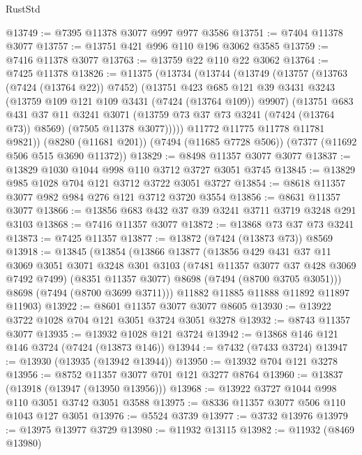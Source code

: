 \begin{lexlean}{RustStd}
\begin{coremodule}
@13749 := @7395 @11378 @3077 @997 @977 @3586
@13751 := @7404 @11378 @3077
@13757 := @13751 @421 @996 @110 @196 @3062 @3585
@13759 := @7416 @11378 @3077
@13763 := @13759 @22 @110 @22 @3062
@13764 := @7425 @11378
@13826 := @11375
    (@13734
      (@13744
        (@13749
          (@13757
            (@13763 (@7424 (@13764 @22)) @7452)
            (@13751
              @423
              @685
              @121
              @39
              @3431
              @3243
              (@13759 @109 @121 @109 @3431 (@7424 (@13764 @109)) @9907)
              (@13751
                @683
                @431
                @37
                @11
                @3241
                @3071
                (@13759 @73 @37 @73 @3241 (@7424 (@13764 @73)) @8569)
                (@7505 @11378 @3077)))))
        @11772
        @11775
        @11778
        @11781
        @9821))
    (@8280 (@11681 @201))
    (@7494 (@11685 @7728 @506))
    (@7377 (@11692 @506 @515 @3690 @11372))
@13829 := @8498 @11357 @3077 @3077
@13837 := @13829 @1030 @1044 @998 @110 @3712 @3727 @3051 @3745
@13845 := @13829 @985 @1028 @704 @121 @3712 @3722 @3051 @3727
@13854 := @8618 @11357 @3077 @982 @984 @276 @121 @3712 @3720 @3554
@13856 := @8631 @11357 @3077
@13866 := @13856 @683 @432 @37 @39 @3241 @3711 @3719 @3248 @291 @3103
@13868 := @7416 @11357 @3077
@13872 := @13868 @73 @37 @73 @3241
@13873 := @7425 @11357
@13877 := @13872 (@7424 (@13873 @73)) @8569
@13918 := @13845
    (@13854
      (@13866
        @13877
        (@13856
          @429
          @431
          @37
          @11
          @3069
          @3051
          @3071
          @3248
          @301
          @3103
          (@7481 @11357 @3077 @37 @428 @3069 @7492 @7499)
          (@8351 @11357 @3077)
          @8698
          (@7494 (@8700 @3705 @3051)))
        @8698
        (@7494 (@8700 @3699 @3711)))
      @11882
      @11885
      @11888
      @11892
      @11897
      @11903)
@13922 := @8601 @11357 @3077 @3077 @8605
@13930 := @13922 @3722 @1028 @704 @121 @3051 @3724 @3051 @3278
@13932 := @8743 @11357 @3077
@13935 := @13932 @1028 @121 @3724
@13942 := @13868 @146 @121 @146 @3724 (@7424 (@13873 @146))
@13944 := @7432 (@7433 @3724)
@13947 := @13930 (@13935 (@13942 @13944))
@13950 := @13932 @704 @121 @3278
@13956 := @8752 @11357 @3077 @701 @121 @3277 @8764
@13960 := @13837 (@13918 (@13947 (@13950 @13956)))
@13968 := @13922 @3727 @1044 @998 @110 @3051 @3742 @3051 @3588
@13975 := @8336 @11357 @3077 @506 @110 @1043 @127 @3051
@13976 := @5524 @3739
@13977 := @3732 @13976
@13979 := @13975 @13977 @3729
@13980 := @11932 @13115
@13982 := @11932 (@8469 @13980)

\end{coremodule}
\end{lexlean}
